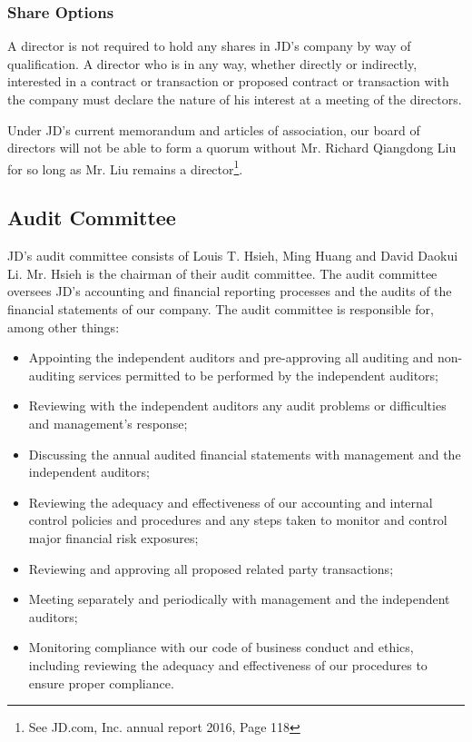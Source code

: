 \subsubsection{Share Options}
A director is not required to hold any shares in JD’s company by way of qualification. A director who is in any way, whether directly or indirectly, interested in a contract or transaction or proposed contract or transaction with the company must declare the nature of his interest at a meeting of the directors.

Under JD’s current memorandum and articles of association, our board of directors will not be able to form a quorum without Mr. Richard Qiangdong Liu for so long as Mr. Liu remains a director\footnote{See JD.com, Inc. annual report 2016, Page 118}.

\subsection{Audit Committee}
JD’s audit committee consists of Louis T. Hsieh, Ming Huang and David Daokui Li. Mr. Hsieh is the chairman of their audit committee.
The audit committee oversees JD’s accounting and financial reporting processes and the audits of the financial statements of our company.
The audit committee is responsible for, among other things:
\begin{itemize}
\item Appointing the independent auditors and pre-approving all auditing and non-auditing services permitted to be performed by the independent auditors;
\item Reviewing with the independent auditors any audit problems or difficulties and management’s response;
\item Discussing the annual audited financial statements with management and the independent auditors;
\item Reviewing the adequacy and effectiveness of our accounting and internal control policies and procedures and any steps taken to monitor and control major financial risk exposures;
\item Reviewing and approving all proposed related party transactions;
\item Meeting separately and periodically with management and the independent auditors;
\item Monitoring compliance with our code of business conduct and ethics, including reviewing the adequacy and effectiveness of our procedures to ensure proper compliance.
\end{itemize}

